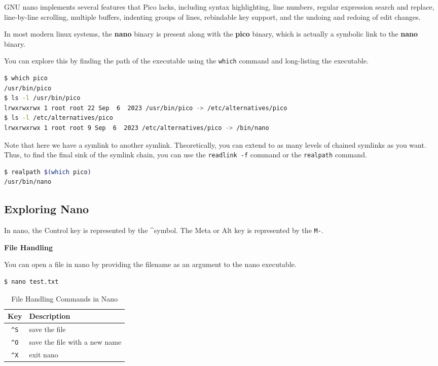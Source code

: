 GNU nano implements several features that Pico lacks,
including syntax highlighting, line numbers,
regular expression search and replace,
line-by-line scrolling, multiple buffers,
indenting groups of lines, rebindable key support,
and the undoing and redoing of edit changes.

In most modern linux systems, the \textbf{nano}
binary is present along with the \textbf{pico}
binary, which is actually a symbolic link to the
\textbf{nano} binary.

You can explore this by finding the path of the
executable using the \texttt{which} command
and long-listing the executable.

\begin{lstlisting}[language=bash]
$ which pico
/usr/bin/pico
$ ls -l /usr/bin/pico
lrwxrwxrwx 1 root root 22 Sep  6  2023 /usr/bin/pico -> /etc/alternatives/pico
$ ls -l /etc/alternatives/pico
lrwxrwxrwx 1 root root 9 Sep  6  2023 /etc/alternatives/pico -> /bin/nano
\end{lstlisting}

\begin{remark}
  Note that here we have a symlink to another symlink.
  Theoretically, you can extend to as many levels of
  chained symlinks as you want.
  Thus, to find the final sink of the symlink chain,
  you can use the \texttt{readlink -f} command or
  the \texttt{realpath} command.
\end{remark}

\begin{lstlisting}[language=bash]
$ realpath $(which pico)
/usr/bin/nano
\end{lstlisting}

\subsection{Exploring Nano}

In nano, the Control key is represented by the \textasciicircum symbol.
The Meta or Alt key is represented by the \texttt{M-}.

\textbf{File Handling}

You can open a file in nano by providing the filename
as an argument to the nano executable.

\begin{lstlisting}[language=bash]
$ nano test.txt
\end{lstlisting}

\begin{table}[h!]
  \caption{File Handling Commands in Nano}
  \begin{tabular}{c l}
    \toprule
    Key & Description \\
    \midrule
    \texttt{\textasciicircum S} & save the file \\
    \texttt{\textasciicircum O} & save the file with a new name \\
    \texttt{\textasciicircum X} & exit nano \\
    \bottomrule
  \end{tabular}
\end{table}

